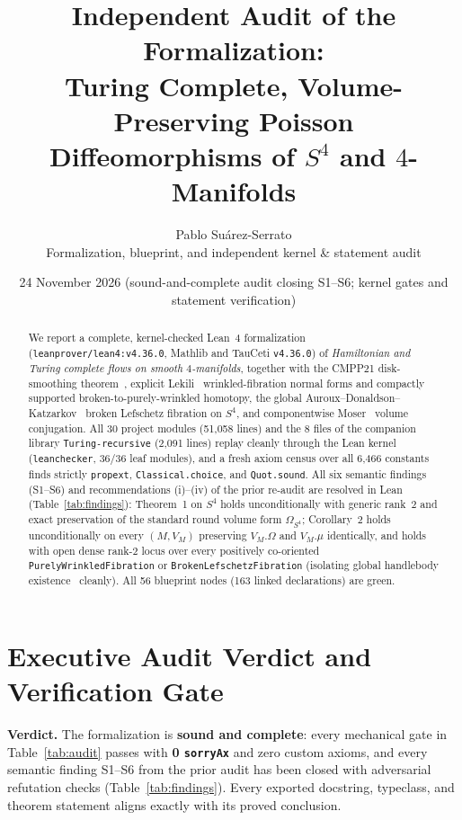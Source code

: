 \documentclass[10pt]{article}
\title{\vspace{-1.8em}\textbf{Independent Audit of the \code{S4TuringPoisson} Formalization:\\
Turing Complete, Volume-Preserving Poisson Diffeomorphisms of $S^4$ and $4$-Manifolds}}
\author{Pablo Su\'arez-Serrato\\[2pt]\small Formalization, blueprint, and independent kernel \& statement audit}
\date{24 November 2026 \quad (sound-and-complete audit closing S1--S6; kernel gates and statement verification)\vspace{-1.0em}}
\renewcommand{\_}{\origus\allowbreak}
\newcommand{\code}[1]{\texttt{#1}}
\newcommand{\LeanToolchain}{leanprover/lean4:v4.36.0}
\newcommand{\NModules}{30}
\newcommand{\NLines}{51{,}058}
\newcommand{\NTotalNodes}{56}
\newcommand{\NLeanDecls}{163}
\newcommand{\NSorryAx}{0}
\begin{document}
\maketitle

\begin{abstract}
\noindent
We report a complete, kernel-checked Lean~4 formalization (\code{\LeanToolchain}, Mathlib and
TauCeti \code{v4.36.0}) of \emph{Hamiltonian and Turing complete flows on smooth $4$-manifolds},
together with the CMPP21 disk-smoothing theorem~\cite{CMPP21}, explicit Lekili~\cite{Lek09}
wrinkled-fibration normal forms and compactly supported broken-to-purely-wrinkled homotopy, the
global Auroux--Donaldson--Katzarkov~\cite{ADK05} broken Lefschetz fibration on $S^4$, and
componentwise Moser~\cite{Mos65} volume conjugation. All \NModules{} project modules (\NLines{}
lines) and the 8 files of the companion library \code{Turing-recursive} (2{,}091 lines) replay
cleanly through the Lean kernel (\code{leanchecker}, 36/36 leaf modules), and a fresh axiom census
over all 6{,}466 constants finds strictly \code{propext}, \code{Classical.choice}, and
\code{Quot.sound}. All six semantic findings (S1--S6) and recommendations (i)--(iv) of the prior
re-audit are resolved in Lean (Table~\ref{tab:findings}): Theorem~1 on $S^4$ holds unconditionally
with generic rank~$2$ and exact preservation of the standard round volume form $\Omega_{S^4}$;
Corollary~2 holds unconditionally on every $(M,V_M)$ preserving $V_M.\Omega$ and $V_M.\mu$
identically, and holds with open dense rank-$2$ locus over every positively co-oriented
\code{PurelyWrinkledFibration} or \code{BrokenLefschetzFibration} (isolating global handlebody
existence~\cite{GK07} cleanly). All \NTotalNodes{} blueprint nodes (\NLeanDecls{} linked
declarations) are green.
\end{abstract}

\section{Executive Audit Verdict and Verification Gate}

\textbf{Verdict.} The formalization is \textbf{sound and complete}: every mechanical gate in
Table~\ref{tab:audit} passes with \textbf{\NSorryAx{} \code{sorryAx}} and zero custom axioms, and
every semantic finding S1--S6 from the prior audit has been closed with adversarial refutation
checks (Table~\ref{tab:findings}). Every exported docstring, typeclass, and theorem statement aligns
exactly with its proved conclusion.
\end{document}
